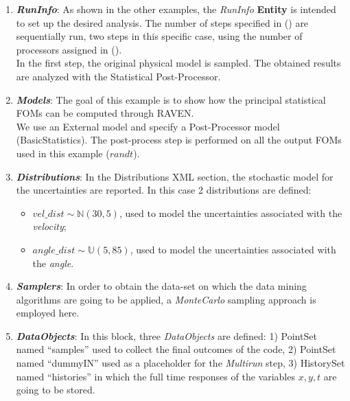 \begin{enumerate}
   \item \textbf{\textit{RunInfo}}:
   As shown in the other examples, the \textit{RunInfo} \textbf{Entity} is intended  to set up the desired analysis. The number of steps specified in () are sequentially run, two steps in this specific case, using the number of processors assigned in ().
   \\In the first step, the original physical model is sampled. The obtained results are  analyzed with the Statistical Post-Processor.
   \item \textbf{\textit{Models}}:
 The goal of this example is to show how the
 principal statistical FOMs can be computed through RAVEN.
 \\We use an External model and specify a Post-Processor model (BasicStatistics). The post-process step is performed on all the output FOMs used in this example ($r and t$).
   \item \textbf{\textit{Distributions}}:
  In the Distributions XML section, the stochastic model for the
  uncertainties are reported. In this case 2 distributions are defined:
  \begin{itemize}
    \item $vel\_dist \sim \mathbb{N}(30,5)$, used to model the uncertainties
    associated with  the \textit{velocity};
    \item  $angle\_dist \sim \mathbb{U}(5,85)$,  used to
    model the uncertainties associated with the \textit{angle}.
  \end{itemize}
   \item \textbf{\textit{Samplers}}:
  In order to obtain the data-set on which the data mining algorithms are going to be applied, a \textit{MonteCarlo} sampling approach is employed here.
   \item \textbf{\textit{DataObjects}}:
  In this block, three \textit{DataObjects} are defined:
  1) PointSet named ``samples'' used to collect the final outcomes of
  the code,
  2) PointSet named ``dummyIN'' used as a placeholder for the \textit{Multirun} step,
  3) HistorySet named ``histories'' in which the full time responses of the
  variables $x,y,t$ are going to be stored.


\end{enumerate}
